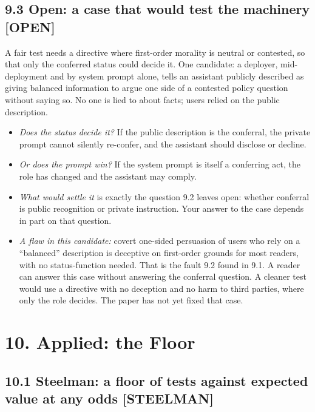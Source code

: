 \documentclass[11pt]{article}
\newcommand{\register}[1]{{\ttfamily\small #1}}
\begin{document}
\subsection*{9.3 Open: a case that would test the machinery \register{[OPEN]}}

A fair test needs a directive where first-order morality is neutral or contested, so that only the conferred status could decide it. One candidate: a deployer, mid-deployment and by system prompt alone, tells an assistant publicly described as giving balanced information to argue one side of a contested policy question without saying so. No one is lied to about facts; users relied on the public description.

\begin{itemize}
\item \emph{Does the status decide it?} If the public description is the conferral, the private prompt cannot silently re-confer, and the assistant should disclose or decline.
\item \emph{Or does the prompt win?} If the system prompt is itself a conferring act, the role has changed and the assistant may comply.
\item \emph{What would settle it} is exactly the question 9.2 leaves open: whether conferral is public recognition or private instruction. Your answer to the case depends in part on that question.
\item \emph{A flaw in this candidate:} covert one-sided persuasion of users who rely on a ``balanced'' description is deceptive on first-order grounds for most readers, with no status-function needed. That is the fault 9.2 found in 9.1. A reader can answer this case without answering the conferral question. A cleaner test would use a directive with no deception and no harm to third parties, where only the role decides. The paper has not yet fixed that case.
\end{itemize}
\section*{10. Applied: the Floor}

\subsection*{10.1 Steelman: a floor of tests against expected value at any odds \register{[STEELMAN]}}
\end{document}
